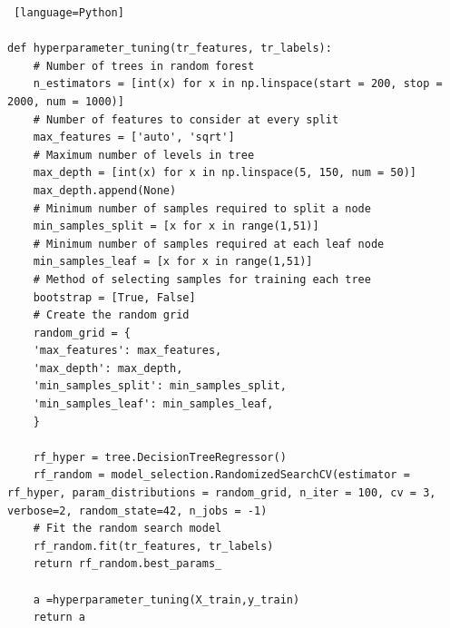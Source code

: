 \begin{lstlisting} [language=Python]

def hyperparameter_tuning(tr_features, tr_labels):
	# Number of trees in random forest
	n_estimators = [int(x) for x in np.linspace(start = 200, stop = 2000, num = 1000)]
	# Number of features to consider at every split
	max_features = ['auto', 'sqrt']
	# Maximum number of levels in tree
	max_depth = [int(x) for x in np.linspace(5, 150, num = 50)]
	max_depth.append(None)
	# Minimum number of samples required to split a node
	min_samples_split = [x for x in range(1,51)]
	# Minimum number of samples required at each leaf node
	min_samples_leaf = [x for x in range(1,51)]
	# Method of selecting samples for training each tree
	bootstrap = [True, False]
	# Create the random grid
	random_grid = {
	'max_features': max_features,
	'max_depth': max_depth,
	'min_samples_split': min_samples_split,
	'min_samples_leaf': min_samples_leaf,
	}
	
	rf_hyper = tree.DecisionTreeRegressor()
	rf_random = model_selection.RandomizedSearchCV(estimator = rf_hyper, param_distributions = random_grid, n_iter = 100, cv = 3, verbose=2, random_state=42, n_jobs = -1)
	# Fit the random search model
	rf_random.fit(tr_features, tr_labels)
	return rf_random.best_params_
	
	a =hyperparameter_tuning(X_train,y_train)
	return a

\end{lstlisting}



